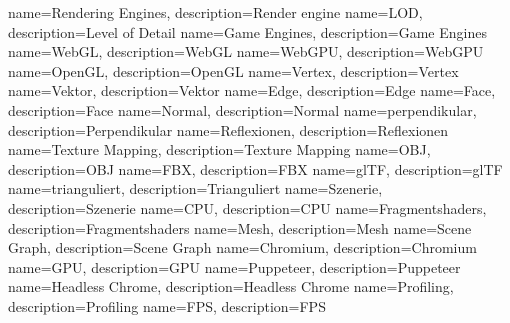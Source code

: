 {
  name={Rendering Engines},
  description={Render engine}
}
{
  name=LOD,
  description={Level of Detail}
}
{
  name={Game Engines},
  description={Game Engines}
}
{
  name=WebGL,
  description={WebGL}
}
{
  name=WebGPU,
  description={WebGPU}
}
{
  name=OpenGL,
  description={OpenGL}
}
{
  name=Vertex,
  description={Vertex}
}
{
  name=Vektor,
  description={Vektor}
}
{
  name=Edge,
  description={Edge}
}
{
  name=Face,
  description={Face}
}
{
  name=Normal,
  description={Normal}
}
{
  name=perpendikular,
  description={Perpendikular}
}
{
  name=Reflexionen,
  description={Reflexionen}
}
{
  name={Texture Mapping},
  description={Texture Mapping}
}
{
  name=OBJ,
  description={OBJ}
}
{
  name=FBX,
  description={FBX}
}
{
  name=glTF,
  description={glTF}
}
{
  name=trianguliert,
  description={Trianguliert}
}
{
  name=Szenerie,
  description={Szenerie}
}
{
  name=CPU,
  description={CPU}
}
{
  name=Fragmentshaders,
  description={Fragmentshaders}
}
{
  name=Mesh,
  description={Mesh}
}
{
  name={Scene Graph},
  description={Scene Graph}
}
{
  name=Chromium,
  description={Chromium}
}
{
  name=GPU,
  description={GPU}
}
{
  name=Puppeteer,
  description={Puppeteer}
}
{
  name={Headless Chrome},
  description={Headless Chrome}
}
{
  name=Profiling,
  description={Profiling}
}
{
  name=FPS,
  description={FPS}
}